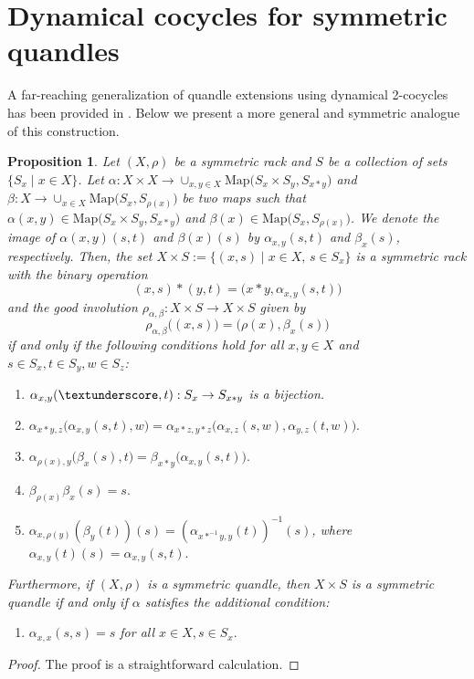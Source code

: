 \documentclass[11pt,reqno]{amsart}
\newtheorem{proposition}[theorem]{Proposition}
\theoremstyle{definition}
\numberwithin{equation}{subsection}
\newcommand{\Map}{\mathrm{Map}}
\begin{document}
\section{Dynamical cocycles for symmetric quandles}\label{section dynamical cocycles}
A far-reaching generalization of quandle extensions using dynamical 2-cocycles has been provided in  \cite[Lemma 2.1]{MR1994219}. Below we present a more general and symmetric analogue of this construction.

\begin{proposition}\label{Dynamical cocycles for symmetric racks}
Let $(X,\rho)$ be a symmetric rack and $S$ be a collection of sets $\{S_x \mid x \in X\}$. Let $\alpha:X \times X \rightarrow \cup_{x,y \in X}\Map\big(S_x \times S_y,S_{x*y}\big)$  and $\beta:X \rightarrow \cup_{x \in X}\Map \big(S_x,S_{\rho(x)}\big)$ be two maps such that $\alpha({x,y}) \in \Map \big(S_x \times S_y, S_{x*y}\big)$ and $\beta(x) \in \Map\big(S_x,S_{\rho(x)}\big)$. We denote the image of $\alpha(x,y)(s,t)$  and $\beta(x)(s)$ by $\alpha_{x,y}(s,t)$ and $\beta_x(s)$, respectively. Then, the set $X \times S:=\{(x,s) \mid x \in X, \, s \in S_x\}$ is a symmetric rack with the binary operation
		$$(x,s)*(y,t)=\big(x*y,\alpha_{x,y}(s,t) \big)$$
		and the good involution $\rho_{\alpha,\beta}:X \times S \rightarrow X \times S$ given by
		\begin{equation*}
			\rho_{\alpha,\beta} \big((x,s) \big) = \big(\rho(x),\beta_x(s) \big)
		\end{equation*}
		if and only if the following conditions hold for all $x,y \in X$ and $s\in S_x, t \in S_y, w\in S_z$:
		\begin{enumerate}
			\item $\alpha_{x,y}(\textunderscore,t):S_x \rightarrow S_{x*y}$ is a bijection.
			\item $\alpha_{x*y,z} \big(\alpha_{x,y}(s,t),w \big)=\alpha_{x*z,y*z} \big(\alpha_{x,z}(s,w),\alpha_{y,z}(t,w) \big).$
			\item $\alpha_{\rho(x),y} \big(\beta_x(s),t \big)=\beta_{x*y} \big(\alpha_{x,y}(s,t) \big).$
			\item $\beta_{\rho(x)}\beta_x(s)=s.$
			\item $\alpha_{x,\rho(y)}(\beta_y(t))(s)=(\alpha_{x*^{-1}y,y}(t))^{-1}(s)$, where $\alpha_{x,y}(t)(s)=\alpha_{x,y}(s,t).$
		\end{enumerate}
	Furthermore, if $(X,\rho)$ is a symmetric quandle, then  $X \times S$ is a symmetric quandle if and only if $\alpha$ satisfies the additional condition: 
	\begin{enumerate}
		\item [(6)] $\alpha_{x,x}(s,s)=s$ for all $x \in X, s \in S_x.$
	\end{enumerate}
	
	\end{proposition}
\begin{proof}
	The proof is a straightforward calculation.
\end{proof}
\end{document}
